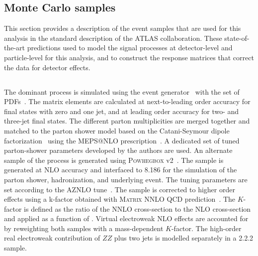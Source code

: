 \subsection{Monte Carlo samples}
\label{sec:montecarlopred}
This section provides a description of the event samples that are used for this analysis in the standard description of the ATLAS collaboration. These state-of-the-art predictions used to model the signal processes at detector-level and particle-level for this analysis, and to construct the response matrices that correct the data for detector effects. 
\subsection{\qqFourL}
The dominant \qqFourL process is simulated using the  event generator~\cite{Bothmann:2019yzt} with the \nnpdfnnlo{} set of PDFs~\cite{Ball:2014uwa}. The matrix elements are calculated at next-to-leading order accuracy for final states with zero and one jet, and at leading order accuracy for two- and three-jet final states. The different parton multiplicities are merged together and matched to the \SHERPA parton shower model based on the Catani-Seymour dipole factorization~\cite{Gleisberg:2008fv} using the MEPS@NLO prescription~\cite{Hoeche:2011fd,Catani:2001cc,Hoeche:2009r}. A dedicated set of tuned parton-shower parameters developed by the \SHERPA authors are used. 
An alternate sample of the \qqFourL process is generated using  \textsc{Powhegbox} v2~\cite{Alioli:2010xd,Melia:2011tj,Nason:2013ydw}. The sample is generated at NLO accuracy and interfaced to \pythia{} 8.186 for the simulation of the parton shower, hadronization, and underlying event. The tuning parameters are set according to the AZNLO tune~\cite{STDM-2012-23}. The sample is corrected to higher order effects using a k-factor obtained with \textsc{Matrix} NNLO QCD prediction~\cite{Cascioli:2014yka,Grazzini:2015hta,Grazzini:2017mhc,Kallweit:2018nyv}. The $K$-factor is defined as the ratio of the NNLO cross-section to the NLO cross-section and applied as a function of \mFourL{}. 
Virtual electroweak NLO effects are accounted for by reweighting both samples with a mass-dependent $K$-factor. The high-order real electroweak contribution of $ZZ$ plus two jets is modelled separately in a \SHERPA{} {2.2.2} sample. 

